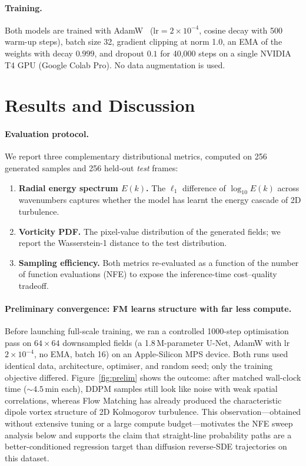 \documentclass{article}
\begin{document}
\paragraph{Training.} Both models are trained with AdamW~\cite{kingma2015adam}
($\text{lr}{=}2{\times}10^{-4}$, cosine decay with 500 warm-up steps),
batch size 32, gradient clipping at norm 1.0, an EMA of the weights with
decay $0.999$, and dropout $0.1$ for 40{,}000 steps on a single NVIDIA T4
GPU (Google Colab Pro). No data augmentation is used.

\section{Results and Discussion}

\paragraph{Evaluation protocol.} We report three complementary
distributional metrics, computed on 256 generated samples and 256 held-out
\emph{test} frames:
\begin{enumerate}
  \item \textbf{Radial energy spectrum $E(k)$.} The $\ell_1$ difference of
  $\log_{10}E(k)$ across wavenumbers captures whether the model has learnt
  the energy cascade of 2D turbulence.
  \item \textbf{Vorticity PDF.} The pixel-value distribution of the
  generated fields; we report the Wasserstein-1 distance to the test
  distribution.
  \item \textbf{Sampling efficiency.} Both metrics re-evaluated as a
  function of the number of function evaluations (NFE) to expose the
  inference-time cost--quality tradeoff.
\end{enumerate}

\paragraph{Preliminary convergence: FM learns structure with far less compute.}
Before launching full-scale training, we ran a controlled 1000-step
optimisation pass on $64{\times}64$ downsampled fields (a 1.8\,M-parameter
U-Net, AdamW with lr $2{\times}10^{-4}$, no EMA, batch 16) on an Apple-Silicon
MPS device. Both runs used identical data, architecture, optimiser, and
random seed; only the training objective differed. Figure~\ref{fig:prelim}
shows the outcome: after matched wall-clock time ($\sim\!4.5$\,min each),
DDPM samples still look like noise with weak spatial correlations, whereas
Flow Matching has already produced the characteristic dipole vortex structure
of 2D Kolmogorov turbulence. This observation---obtained without extensive
tuning or a large compute budget---motivates the NFE sweep analysis below
and supports the claim that straight-line probability paths are a
better-conditioned regression target than diffusion reverse-SDE trajectories
on this dataset.
\end{document}
